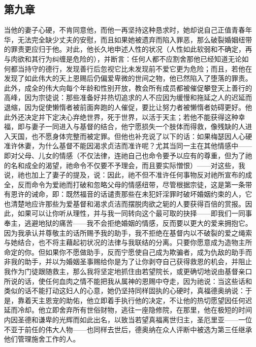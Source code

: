 
\subsection{第九章}

\par

当他的妻子心硬，不肯同意他，而他一再坚持这种恳求时，她却说自己正值青春年华，无法完全缺少丈夫的安慰，而且如果她被遗弃而陷入罪恶，那么破裂婚姻纽带的罪责更应归于他。对此，他长久地申述人性的状况（人性如此软弱和不确定，再与肉欲和其行为纠缠是危险的），并断言：任何人都不应割舍那他已经知道无论如何都当持守的德行，发现善行后忽视它比未发现前不爱它更为危险；而且，若他在发现了如此伟大的天上恩赐后仍偏爱卑微的世间之物，他已然陷入了堕落的罪责。此外，成全的伟大向每个年龄和性别开放，教会所有成员都被催促攀登天上善行的高峰，因为宗徒说：那些准备好并热切追求的人不应因为缓慢和拖延之人的迟延而退缩，因为促使懒惰者被前面奔跑的人催促，要比让努力者被懒惰者妨碍更好。他此外还决定并下定决心弃绝世界，死于世界，以活于天主；若他不能获得这种幸福，即与妻子一同进入与基督的结合，他宁愿损失一个肢体而得救，像残缺的人进入天国，也不愿身体完整而被定罪。但他也补充说了以下的话：如果梅瑟因人心硬准许休妻，为什么基督不能因渴求贞洁而准许呢？尤其当同一主在其他情感中——即对父母、儿女的情感（不仅法律，连祂自己也命令要予以应有的尊重，但为了祂的名和成全的渴望，祂命令不仅要不予理会，而且要实际憎恨）——对这些，我说，祂也加上了妻子的提及，说：因此，祂不但不准许任何事物反对祂所宣布的成全，反而命令为爱祂而打破和忽略父母的情感纽带，尽管根据宗徒，这是第一条带有恩许的诫命，即：既然福音的话谴责那些在未犯奸淫罪时破坏婚姻约束的人，它也清楚地应许那些为爱基督和渴求贞洁而摆脱肉欲之轭的人要获得百倍的赏报。因此，如果可以让你听从理性，并与我一同转向这个最可取的抉择——即我们一同事奉主，逃避地狱的痛苦——我不会拒绝婚姻的情感，反而要以更大的爱来拥抱它。因为我承认并尊敬主的话所赐予我的助手，我不拒绝在基督内以不破裂的爱之绳索与她结合，也不将主藉起初状况的法律与我联结的分离。只要你愿意成为造物主所命定的你。但如果你不愿做助手，反而宁愿使自己成为欺骗者，成为仇敌的助手而非我的助手，并以为婚姻圣事赐给你是为了让你剥夺自己获得救恩的机会，并阻止我作为门徒跟随救主，那么我将坚定地抓住由若望院长，或更确切地说由基督亲口所说的话，使任何血肉之情不能把我从属神的恩赐中夺走，因为祂说：当这些话和类似的话不能打动这妇人的心意，她仍坚持同样固执的心硬时，真福德奥纳说：于是，靠着天主恩宠的助佑，他立即着手执行他的决定，不让他的热切愿望因任何迟延而冷却。他立即舍弃所有世俗财物，逃往一座隐修院，在那里，他在极短的时间内因圣德和谦卑的光辉而如此出名，以致当若望真福离世归主，圣厄里亚——一位不亚于前任的伟大人物——也同样去世后，德奥纳在众人评断中被选为第三任继承他们管理施舍工作的人。\par

